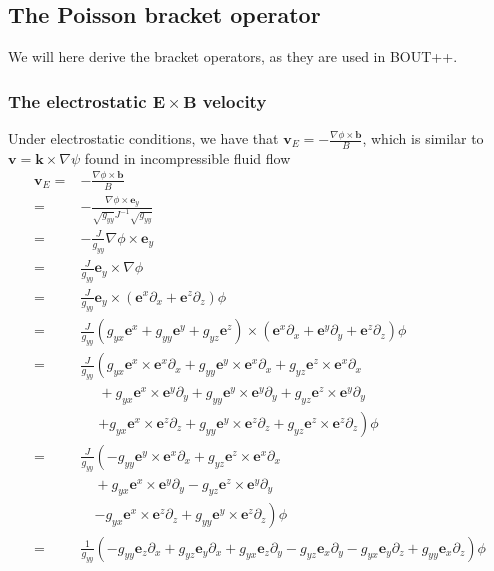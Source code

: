 \documentclass[12pt]{article}
\def\L{\left}
\def\R{\right}
\newcommand{\ve}[1]{\ensuremath{\boldsymbol{#1}}}
\begin{document}
\subsection{The Poisson bracket operator}
%
We will here derive the bracket operators, as they are used in BOUT++.

\subsubsection{The electrostatic \texorpdfstring{$\ve{E}\times \ve{B}$}{ExB}
	       velocity}
%
Under electrostatic conditions, we have that $\ve{v}_E =
-\frac{\nabla\phi\times\ve{b}}{B}$, which is similar to
$\ve{v}=\ve{k}\times\nabla\psi$ found in incompressible fluid flow
%
\begin{align*}
    \ve{v}_E =& -\frac{\nabla\phi\times\ve{b}}{B}\\
	     =&-\frac{\nabla\phi\times\ve{e}_y}{
               \sqrt{g_{yy}}J^{-1}\sqrt{g_{yy}}}\\
	     =&-\frac{J}{g_{yy}}\nabla\phi\times\ve{e}_y\\
	     =&\frac{J}{g_{yy}}\ve{e}_y\times\nabla\phi\\
	     =&\frac{J}{g_{yy}}\ve{e}_y\times
	       \L(\ve{e}^x\partial_x + \ve{e}^z\partial_z\R)\phi\\
	     =&\frac{J}{g_{yy}}
	       \L(g_{yx}\ve{e}^x + g_{yy}\ve{e}^y + g_{yz}\ve{e}^z\R)
	       \times
	       \L(\ve{e}^x\partial_x +
	          \ve{e}^y\partial_y +
                  \ve{e}^z\partial_z\R)\phi\\
	     =&\frac{J}{g_{yy}}
	       \L(
	         g_{yx}\ve{e}^x\times\ve{e}^x\partial_x
	       + g_{yy}\ve{e}^y\times\ve{e}^x\partial_x
	       + g_{yz}\ve{e}^z\times\ve{e}^x\partial_x
	       \R.
	       \\
	       &\quad\;
	       + g_{yx}\ve{e}^x\times\ve{e}^y\partial_y
	       + g_{yy}\ve{e}^y\times\ve{e}^y\partial_y
	       + g_{yz}\ve{e}^z\times\ve{e}^y\partial_y
	       \\
	       &\quad\;
	       \L.
	       + g_{yx}\ve{e}^x\times\ve{e}^z\partial_z
	       + g_{yy}\ve{e}^y\times\ve{e}^z\partial_z
	       + g_{yz}\ve{e}^z\times\ve{e}^z\partial_z
	       \R)
	       \phi\\
	     =&\frac{J}{g_{yy}}
	       \L(
	       - g_{yy}\ve{e}^y\times\ve{e}^x\partial_x
	       + g_{yz}\ve{e}^z\times\ve{e}^x\partial_x
	       \R.
	       \\
	       &\quad
	       + g_{yx}\ve{e}^x\times\ve{e}^y\partial_y
	       - g_{yz}\ve{e}^z\times\ve{e}^y\partial_y
	       \\
	       &\quad
	       \L.
	       - g_{yx}\ve{e}^x\times\ve{e}^z\partial_z
	       + g_{yy}\ve{e}^y\times\ve{e}^z\partial_z
	       \R)
	       \phi\\
	     =&\frac{1}{g_{yy}}
	       \L(
	       - g_{yy}\ve{e}_z\partial_x
	       + g_{yz}\ve{e}_y\partial_x
	       + g_{yx}\ve{e}_z\partial_y
	       - g_{yz}\ve{e}_x\partial_y
	       - g_{yx}\ve{e}_y\partial_z
	       + g_{yy}\ve{e}_x\partial_z
	       \R)
	       \phi
\end{align*}
\end{document}
